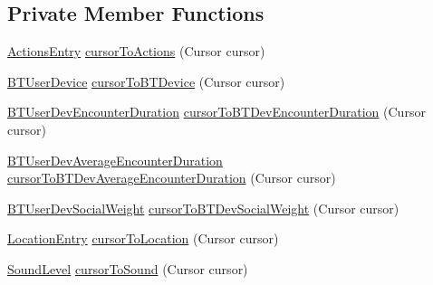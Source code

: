 \subsection*{Private Member Functions}
\begin{DoxyCompactItemize}
\item 
\hyperlink{classcs_1_1usense_1_1accelerometer_1_1_actions_entry}{Actions\+Entry} \hyperlink{classcs_1_1usense_1_1db_1_1_usense_data_source_abbe275083aca050d1cbd6bbbdea06998}{cursor\+To\+Actions} (Cursor cursor)
\item 
\hyperlink{classcs_1_1usense_1_1bluetooth_1_1_b_t_user_device}{B\+T\+User\+Device} \hyperlink{classcs_1_1usense_1_1db_1_1_usense_data_source_acad2f3e8a11782169f8f6941959039d1}{cursor\+To\+B\+T\+Device} (Cursor cursor)
\item 
\hyperlink{classcs_1_1usense_1_1bluetooth_1_1_b_t_user_dev_encounter_duration}{B\+T\+User\+Dev\+Encounter\+Duration} \hyperlink{classcs_1_1usense_1_1db_1_1_usense_data_source_ae0294f5a8d5deb5e122a952c5a1d0364}{cursor\+To\+B\+T\+Dev\+Encounter\+Duration} (Cursor cursor)
\item 
\hyperlink{classcs_1_1usense_1_1bluetooth_1_1_b_t_user_dev_average_encounter_duration}{B\+T\+User\+Dev\+Average\+Encounter\+Duration} \hyperlink{classcs_1_1usense_1_1db_1_1_usense_data_source_a7f7c118dce0e90ab6bb9702fd3ed8ae1}{cursor\+To\+B\+T\+Dev\+Average\+Encounter\+Duration} (Cursor cursor)
\item 
\hyperlink{classcs_1_1usense_1_1bluetooth_1_1_b_t_user_dev_social_weight}{B\+T\+User\+Dev\+Social\+Weight} \hyperlink{classcs_1_1usense_1_1db_1_1_usense_data_source_ad6b535b88ac79cfa89cc85a88746d837}{cursor\+To\+B\+T\+Dev\+Social\+Weight} (Cursor cursor)
\item 
\hyperlink{classcs_1_1usense_1_1location_1_1_location_entry}{Location\+Entry} \hyperlink{classcs_1_1usense_1_1db_1_1_usense_data_source_a943576fbfbaa055cafa80e6a91ed948a}{cursor\+To\+Location} (Cursor cursor)
\item 
\hyperlink{classcs_1_1usense_1_1microphone_1_1_sound_level}{Sound\+Level} \hyperlink{classcs_1_1usense_1_1db_1_1_usense_data_source_a8ad9511fece0a0b5bb954e41de8bf62a}{cursor\+To\+Sound} (Cursor cursor)
\end{DoxyCompactItemize}
